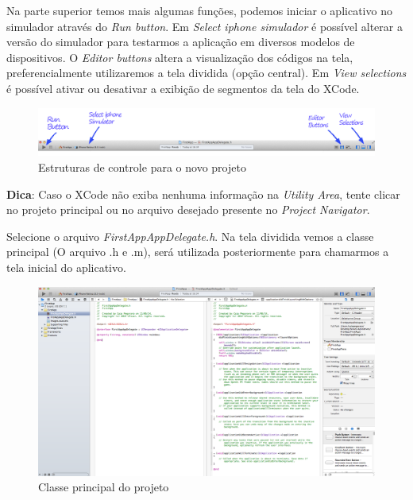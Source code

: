 \documentclass[a4paper,12pt,brazil,doubleside]{book}
\begin{document}
\begin{singlespace}
Na parte superior temos mais algumas funções, podemos iniciar o aplicativo no simulador através do \emph{Run button}. Em \emph{Select iphone simulador} é possível alterar a versão do simulador para testarmos a aplicação em diversos modelos de dispositivos. O \emph{Editor buttons} altera a visualização dos códigos na tela, preferencialmente utilizaremos a tela dividida (opção central). Em \emph{View selections} é possível ativar ou desativar a exibição de segmentos da tela do XCode.

\begin{figure}[H]
  \centering
  \includegraphics[width=.85\textwidth]{figuras/3/tela_principal_xcode_run.png}
  \caption{Estruturas de controle para o novo projeto}
  \label{fig:a}
\end{figure}

\begin{framed}

\textbf{Dica}: Caso o XCode não exiba nenhuma informação na
\textit{Utility Area}, tente clicar no projeto principal ou no arquivo desejado presente no \textit{Project Navigator}.
\end{framed}


 Selecione o arquivo \emph{FirstAppAppDelegate.h}. Na tela dividida vemos a classe principal (O arquivo .h e .m), será utilizada posteriormente para chamarmos a tela inicial do aplicativo.

\begin{figure}[H]
  \centering
  \includegraphics[width=.99\textwidth]{figuras/3/tela_novo_projeto_5.png}
  \caption{Classe principal do projeto}
  \label{fig:a}
\end{figure}



\end{singlespace}
\end{document}
